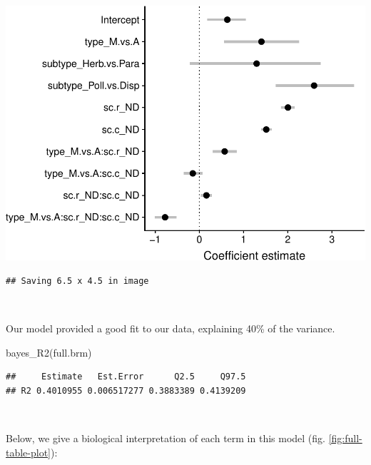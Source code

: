 \documentclass[11pt,]{article}
\newenvironment{Shaded}{}{}
\newcommand{\KeywordTok}[1]{\textcolor[rgb]{0.00,0.00,1.00}{#1}}
\newcommand{\NormalTok}[1]{#1}
\let\origfigure\figure
\let\endorigfigure\endfigure
\renewenvironment{figure}[1][2] {
    \expandafter\origfigure\expandafter[H]
} {
    \endorigfigure
}
\begin{document}
\begin{figure}

{\centering \includegraphics[width=0.75\linewidth]{reproduce_analyses_files/figure-latex/full-table-plot-1} 

}

\caption{Mean and 95\% credible intervals of fixed effects from our full model.}\label{fig:full-table-plot}
\end{figure}

\begin{verbatim}
## Saving 6.5 x 4.5 in image
\end{verbatim}

~

Our model provided a good fit to our data, explaining 40\% of the
variance.

\begin{Shaded}
\begin{Highlighting}[]
\KeywordTok{bayes_R2}\NormalTok{(full.brm)}
\end{Highlighting}
\end{Shaded}

\begin{verbatim}
##     Estimate   Est.Error      Q2.5     Q97.5
## R2 0.4010955 0.006517277 0.3883389 0.4139209
\end{verbatim}

~

Below, we give a biological interpretation of each term in this model
(fig. \ref{fig:full-table-plot}):
\end{document}
